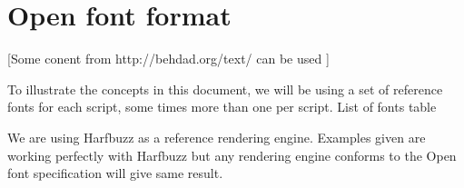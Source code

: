 \chapter{Open font format}






[Some conent from http://behdad.org/text/ can be used ]



To illustrate the concepts in this document, we will be using a set of reference fonts for each script, some times more than one per script. 
List of fonts table


We are using Harfbuzz as  a reference rendering engine. Examples given are working perfectly with Harfbuzz but any rendering engine conforms to the Open font specification will give same result.

